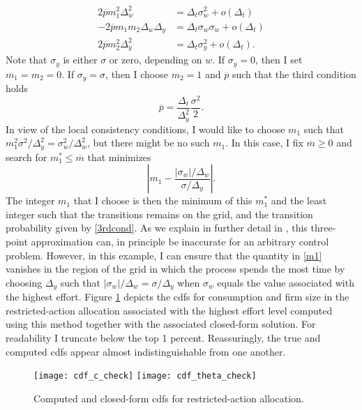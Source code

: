 \documentclass[11pt]{article}
\theoremstyle{plain}
\begin{document}
\begin{align*}
2 \overline{p} m_1^2 \Delta_w^2 & = \Delta_t \sigma_w^2 + o(\Delta_t)
\\ -2 \overline{p} m_1 m_2 \Delta_w \Delta_y & = \Delta_t \sigma_w \sigma_w + o(\Delta_t)
\\ 2 \overline{p} m_2^2 \Delta_y^2 & = \Delta_t \sigma_y^2 + o(\Delta_t).
\end{align*}
Note that $\sigma_y$ is either $\sigma$ or zero, depending on $w$. If $\sigma_y=0$, then I set $m_1=m_2=0$. If $\sigma_y = \sigma$, then I choose $m_2=1$ and $\overline{p}$ such that the third condition holds
\begin{equation} 
\overline{p} = \frac{\Delta_t}{\Delta_y^2} \frac{\sigma^2}{2}. 
\label{3rdcond} 
\end{equation} 
In view of the local consistency conditions, I would like to choose $m_1$ such that $m_1^2 \sigma^2/\Delta_y^2 = \sigma_w^2/\Delta_w^2$, but there might be no such $m_1$. In this case, I fix $\overline{m} \geq 0$ and search for $m_1^* \leq \overline{m}$ that minimizes
\begin{equation}
{\left| m_1  - \frac{|\sigma_w|/\Delta_w}{\sigma/\Delta_y} \right|}.
\label{m1}
\end{equation}
The integer $m_1$ that I choose is then the minimum of this $m^*_1$ and the least integer such that the transitions remains on the grid, and the transition probability given by \eqref{3rdcond}. As we explain in further detail in \cite{phelan_applications_2022}, this three-point approximation can, in principle be inaccurate for an arbitrary control problem. However, in this example, I can ensure that the quantity in \eqref{m1} vanishes in the region of the grid in which the process spends the most time by choosing $\Delta_y$ such that $|\sigma_w|/\Delta_w = \sigma/\Delta_y$ when $\sigma_w$ equals the value associated with the highest effort. Figure \ref{fig:cdf_check} depicts the cdfs for consumption and firm size in the restricted-action allocation associated with the highest effort level computed using this method together with the associated closed-form solution. For readability I truncate below the top 1 percent. Reassuringly, the true and computed cdfs appear almost indistinguishable from one another. 

\begin{figure}[!htb]
\centering
\texttt{[image: cdf\_c\_check]}
\texttt{[image: cdf\_theta\_check]}
\caption{Computed and closed-form cdfs for restricted-action allocation.}\label{fig:cdf_check}
\end{figure}
\end{document}
